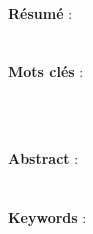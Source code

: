 \thispagestyle{empty}
\hfill
\begin{multicols}{3}{
\begin{flushleft}
    \large\auteur 
\end{flushleft}
\begin{center}
    \large\bsc\diplome 
\end{center}
\begin{flushright}
    \large\PhDannee 
\end{flushright}}
\end{multicols} 

\begin{center}
\linia
\medskip
    {\Large\titrefr} \\
\linia
\end{center}
\medskip 
    \normalsize\textbf{Résumé} : \\
     \\
\medskip \\
\textbf{Mots clés} : \\
\keywordfr \\

\medskip
\begin{center}
\linia
\medskip
    {\Large\titreen} \\
\linia
\end{center}
\medskip
    \textbf{Abstract} : \\
     \\
\medskip \\
\textbf{Keywords} : \\
\keyworden \\
\hfill
\restoregeometry